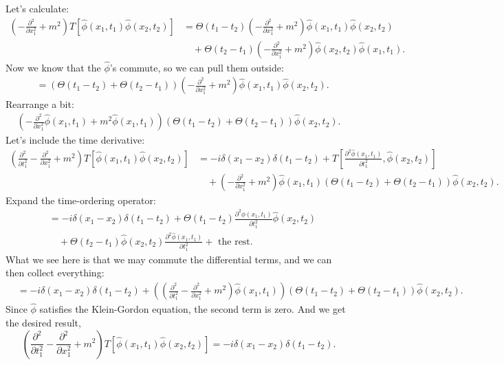 \documentclass[working, oneside]{../../Preambles/tuftebook}
\begin{document}
\begin{solution}
Let’s calculate:
\begin{align*}
\left( - \frac{\partial^2}{\partial x_1^2} + m^2 \right) T \left[ \hat{\phi}(x_1, t_1) \hat{\phi}(x_2, t_2) \right]
&= \Theta(t_1 - t_2) \left( - \frac{\partial^2}{\partial x_1^2} + m^2 \right) \hat{\phi}(x_1, t_1) \hat{\phi}(x_2, t_2) \\
&\quad + \Theta(t_2 - t_1) \left( - \frac{\partial^2}{\partial x_1^2} + m^2 \right) \hat{\phi}(x_2, t_2) \hat{\phi}(x_1, t_1).
\end{align*}
Now we know that the $\hat{\phi}$'s commute, so we can pull them outside:
\begin{align*}
&= \left( \Theta(t_1 - t_2) + \Theta(t_2 - t_1) \right) \left( - \frac{\partial^2}{\partial x_1^2} + m^2 \right) \hat{\phi}(x_1, t_1) \hat{\phi}(x_2, t_2).
\end{align*}
Rearrange a bit:
\begin{align*}
\left( - \frac{\partial^2}{\partial x_1^2} \hat{\phi}(x_1, t_1) + m^2 \hat{\phi}(x_1, t_1) \right) \left( \Theta(t_1 - t_2) + \Theta(t_2 - t_1) \right) \hat{\phi}(x_2, t_2).
\end{align*}
Let’s include the time derivative:
\begin{align*}
\left( \frac{\partial^2}{\partial t_1^2} - \frac{\partial^2}{\partial x_1^2} + m^2 \right) T \left[ \hat{\phi}(x_1, t_1) \hat{\phi}(x_2, t_2) \right]
&= -i \delta(x_1 - x_2) \delta(t_1 - t_2) + T \left[ \frac{\partial^2 \hat{\phi}(x_1, t_1)}{\partial t_1^2}, \hat{\phi}(x_2, t_2) \right] \\
&\quad + \left( - \frac{\partial^2}{\partial x_1^2} + m^2 \right) \hat{\phi}(x_1, t_1) \left( \Theta(t_1 - t_2) + \Theta(t_2 - t_1) \right) \hat{\phi}(x_2, t_2).
\end{align*}
Expand the time-ordering operator:
\begin{align*}
&= -i \delta(x_1 - x_2) \delta(t_1 - t_2) + \Theta(t_1 - t_2) \frac{\partial^2 \hat{\phi}(x_1, t_1)}{\partial t_1^2} \hat{\phi}(x_2, t_2) \\
&\quad + \Theta(t_2 - t_1) \hat{\phi}(x_2, t_2) \frac{\partial^2 \hat{\phi}(x_1, t_1)}{\partial t_1^2} + \text{ the rest.}
\end{align*}
What we see here is that we may commute the differential terms, and we can then collect everything:
\begin{align*}
&= -i \delta(x_1 - x_2) \delta(t_1 - t_2) + \left( \left( \frac{\partial^2}{\partial t_1^2} - \frac{\partial^2}{\partial x_1^2} + m^2 \right) \hat{\phi}(x_1, t_1) \right) \left( \Theta(t_1 - t_2) + \Theta(t_2 - t_1) \right) \hat{\phi}(x_2, t_2).
\end{align*}
Since $\hat{\phi}$ satisfies the Klein-Gordon equation, the second term is zero. And we get the desired result,
\[
\left( \frac{\partial^2}{\partial t_1^2} - \frac{\partial^2}{\partial x_1^2} + m^2 \right) T\left[ \hat{\phi }\left( x_1, t_1 \right) \hat{\phi }\left( x_2, t_2 \right)  \right] = -i\delta\left( x_1- x_2 \right) \delta\left( t_1-t_2 \right) 
.\] 
\end{solution}
\end{document}
